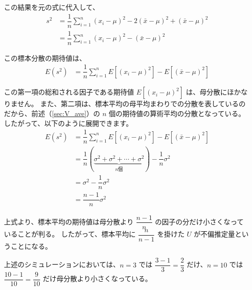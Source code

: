 \documentclass[uplatex,11pt,a4paper]{jsarticle}
\begin{document}
この結果を元の式に代入して、
\begin{align*}
s^2
	&=\dfrac{1}{n} \sum_{i=1}^n (x_i-\mu)^2 -2(\bar{x} -\mu)^2 + (\bar{x} -\mu)^2 \\[6pt]
	&=\dfrac{1}{n} \sum_{i=1}^n (x_i-\mu)^2 -(\bar{x} -\mu)^2
\end{align*}

この標本分散の期待値は、
\begin{align*}
E(s^2)
	&=\dfrac{1}{n} \sum_{i=1}^n E [(x_i-\mu)^2] - E[(\bar{x} -\mu)^2]
\end{align*}

この第一項の総和される因子である期待値 $E [(x_i-\mu)^2]$ は、母分散にほかなりません。
また、第二項は、標本平均の母平均まわりでの分散を表しているのだから、前述（\ref{sec:V_ave}）の $n$ 個の期待値の算術平均の分散となっている。
したがって、以下のように展開できます。
\begin{align*}
E(s^2)
	&=\dfrac{1}{n} \sum_{i=1}^n E [(x_i-\mu)^2] - E[(\bar{x} -\mu)^2] \\[6pt]
	&=\dfrac{1}{n} (\underbrace{\sigma^2 + \sigma^2 + \cdots + \sigma^2}_{n \text{個}}) - \dfrac{1}{n} \sigma^2 \\[6pt]
	&=\sigma^2 - \dfrac{1}{n} \sigma^2 \\[6pt]
	&=\dfrac{n-1}{n} \sigma^2
\end{align*}

上式より、標本平均の期待値は母分散より $\dfrac{n-1}{n}$ の因子の分だけ小さくなっていることが判る。
したがって、標本平均に $\dfrac{n}{n-1}$ を掛けた $U$ が不偏推定量ということになる。

上述のシミュレーションにおいては、$n=3$ では $\dfrac{3-1}{3}=\dfrac{2}{3}$ だけ、$n=10$ では $\dfrac{10-1}{10}=\dfrac{9}{10}$ だけ母分散より小さくなっている。
\end{document}

